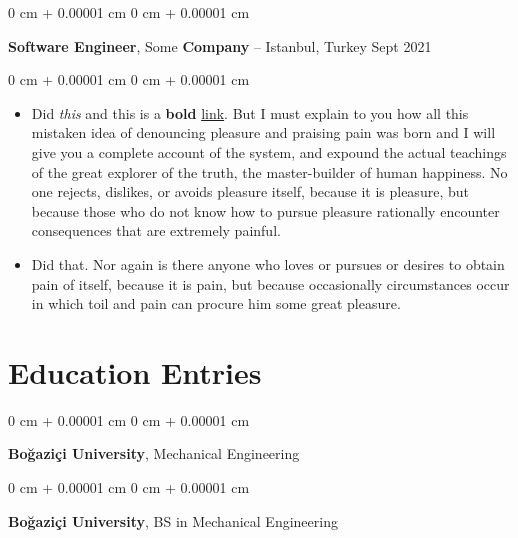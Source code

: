 \documentclass[10pt, letterpaper]{article}
\newenvironment{highlights}{
    \begin{itemize}[
        topsep=0.10 cm,
        parsep=0.10 cm,
        partopsep=0pt,
        itemsep=0pt,
        leftmargin=0 cm + 10pt
    ]
}{
    \end{itemize}
} %
\newenvironment{onecolentry}{
    \begin{adjustwidth}{
        0 cm + 0.00001 cm
    }{
        0 cm + 0.00001 cm
    }
}{
    \end{adjustwidth}
} %
\newenvironment{twocolentry}[2][]{
    \onecolentry
    \def\secondColumn{#2}
    \setcolumnwidth{\fill, 4.5 cm}
    \begin{paracol}{2}
}{
    \switchcolumn \raggedleft \secondColumn
    \end{paracol}
    \endonecolentry
} %
\begin{document}
        \vspace{0.2 cm}

        \begin{twocolentry}{
            Sept 2021
        }
            \textbf{Software Engineer}, Some \textbf{Company} -- Istanbul, Turkey\end{twocolentry}

        \vspace{0.10 cm}
        \begin{onecolentry}
            \begin{highlights}
                \item Did \textit{this} and this is a \textbf{bold} \href{https://example.com}{link}. But I must explain to you how all this mistaken idea of denouncing pleasure and praising pain was born and I will give you a complete account of the system, and expound the actual teachings of the great explorer of the truth, the master-builder of human happiness. No one rejects, dislikes, or avoids pleasure itself, because it is pleasure, but because those who do not know how to pursue pleasure rationally encounter consequences that are extremely painful.
                \item Did that. Nor again is there anyone who loves or pursues or desires to obtain pain of itself, because it is pain, but because occasionally circumstances occur in which toil and pain can procure him some great pleasure.
            \end{highlights}
        \end{onecolentry}



    
    \section{Education Entries}



        
        \begin{onecolentry}
            \textbf{Boğaziçi University}, Mechanical Engineering\end{onecolentry}



        \vspace{0.2 cm}

        \begin{onecolentry}
            \textbf{Boğaziçi University}, BS in Mechanical Engineering\end{onecolentry}
\end{document}

